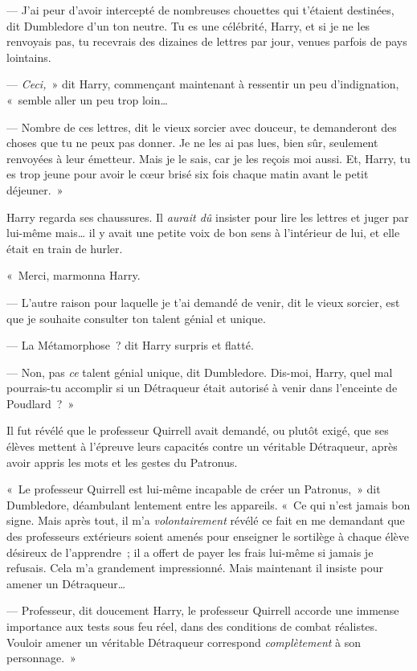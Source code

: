 --- J'ai peur d'avoir intercepté de nombreuses chouettes qui t'étaient destinées, dit Dumbledore d'un ton neutre.
Tu es une célébrité, Harry, et si je ne les renvoyais pas, tu recevrais des dizaines de lettres par jour, venues parfois de pays lointains.

--- \emph{Ceci,}~» dit Harry, commençant maintenant à ressentir un peu d'indignation, «~semble aller un peu trop loin…

--- Nombre de ces lettres, dit le vieux sorcier avec douceur, te demanderont des choses que tu ne peux pas donner.
Je ne les ai pas lues, bien sûr, seulement renvoyées à leur émetteur.
Mais je le sais, car je les reçois moi aussi.
Et, Harry, tu es trop jeune pour avoir le cœur brisé six fois chaque matin avant le petit déjeuner.~»

Harry regarda ses chaussures.
Il \emph{aurait dû} insister pour lire les lettres et juger par lui-même mais… il y avait une petite voix de bon sens à l'intérieur de lui, et elle était en train de hurler.

«~Merci, marmonna Harry.

--- L'autre raison pour laquelle je t'ai demandé de venir, dit le vieux sorcier, est que je souhaite consulter ton talent génial et unique.

--- La Métamorphose~? dit Harry surpris et flatté.

--- Non, pas \emph{ce} talent génial unique, dit Dumbledore.
Dis-moi, Harry, quel mal pourrais-tu accomplir si un Détraqueur était autorisé à venir dans l'enceinte de Poudlard~?~»

\later

Il fut révélé que le professeur Quirrell avait demandé, ou plutôt exigé, que ses élèves mettent à l'épreuve leurs capacités contre un véritable Détraqueur, après avoir appris les mots et les gestes du Patronus.

«~Le professeur Quirrell est lui-même incapable de créer un Patronus,~» dit Dumbledore, déambulant lentement entre les appareils.
«~Ce qui n'est jamais bon signe.
Mais après tout, il m'a \emph{volontairement} révélé ce fait en me demandant que des professeurs extérieurs soient amenés pour enseigner le sortilège à chaque élève désireux de l'apprendre~; il a offert de payer les frais lui-même si jamais je refusais.
Cela m'a grandement impressionné.
Mais maintenant il insiste pour amener un Détraqueur…

--- Professeur, dit doucement Harry, le professeur Quirrell accorde une immense importance aux tests sous feu réel, dans des conditions de combat réalistes.
Vouloir amener un véritable Détraqueur correspond \emph{complètement} à son personnage.~»


